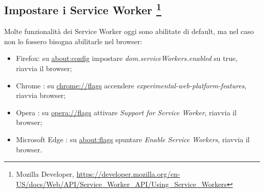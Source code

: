 \documentclass[11pt ,a4paper , twoside , openright ]{book}
\begin{document}
	\subsection[Impostare i Service Worker]{Impostare i Service Worker \footnote{Mozilla Developer, \url{https://developer.mozilla.org/en-US/docs/Web/API/Service_Worker_API/Using_Service_Workers}}}
	Molte funzionalità dei Service Worker oggi sono abilitate di default, ma nel caso non lo fossero bisogna abilitarle nel browser:
	\begin{itemize}
		\item Firefox: su \url{about:config} impostare \textit{dom.serviceWorkers.enabled} su true, riavvia il browser;
		\item Chrome : su \url{chrome://flags} accendere  \textit{experimental-web-platform-features}, riavvia browser;
		\item Opera : su \url{opera://flags} attivare \textit{Support for Service Worker}, riavvia il browser;
		\item Microsoft Edge : su \url{about:flags} spuntare  \textit{Enable Service Workers}, riavvia il browser.
	\end{itemize}
	
\end{document}

